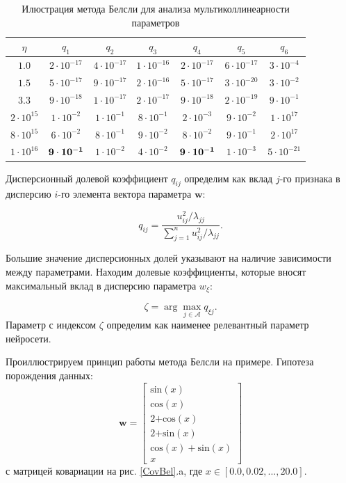 \begin{table}[h]
\begin{center}
\caption{Илюстрация метода Белсли для анализа мультиколлинеарности параметров}
\begin{tabular}{|c|cccccc|}
\hline
$\eta$ & $q_1$& $q_2$& $q_3$& $q_4$& $q_5$& $q_6$\\
\hline
$1.0$ &  $2\cdot 10^{-17}$ &  $4\cdot 10^{-17}$ &  $1\cdot 10^{-16}$ &  $2\cdot 10^{-17}$ &  $6\cdot 10^{-17}$&  $3\cdot 10^{-4}$ \\
\hline
$1.5$ &  $5\cdot 10^{-17}$ &  $9\cdot 10^{-17}$ &  $2\cdot 10^{-16}$ &  $5\cdot 10^{-17}$ &  $3\cdot 10^{-20}$ &  $3\cdot 10^{-2}$ \\
\hline
$3.3$ &  $9\cdot 10^{-18}$ &  $1\cdot 10^{-17}$ &  $2\cdot 10^{-17}$ &  $9\cdot 10^{-18}$ &  $2\cdot 10^{-19}$ &  $9\cdot 10^{-1}$ \\
\hline
$2\cdot 10^{15}$ &  $1\cdot 10^{-2}$ &  $1\cdot 10^{-1}$ &  $8\cdot 10^{-1}$ &  $2\cdot 10^{-3}$ &  $9\cdot 10^{-2}$ &  $1\cdot 10^{17}$ \\ 
\hline
$8\cdot 10^{15}$ &  $6\cdot 10^{-2}$ &  $8\cdot 10^{-1}$ &  $9\cdot 10^{-2}$ &  $8\cdot 10^{-2}$ &  $9\cdot 10^{-1}$ & $ 2\cdot 10^{17} $\\
\hline
$1\cdot 10^{16}$ &  $\bf9\cdot 10^{-1}$ &  $1\cdot 10^{-2}$& $ 4\cdot 10^{-2}$&  $\bf9\cdot 10^{-1}$ &  $1\cdot 10^{-3}$ & $ 5\cdot 10^{-21}$ \\
\hline
\end{tabular}
\label{CovBelTable}
\end{center}
\end{table}

Дисперсионный долевой коэффициент $q_{ij}$ определим как вклад $j$-го признака в дисперсию $i$-го элемента вектора параметра $\textbf{w}$:

\[
q_{ij} = \frac{u^2_{ij}/\lambda_{jj}}{\sum^n_{j=1}{u^2_{ij}/\lambda_{jj}}}.
\]

Большие значение дисперсионных долей указывают на наличие зависимости между параметрами. Находим долевые коэффициенты, которые вносят максимальный вклад в дисперсию параметра $w_\xi$:

\[
\zeta = \arg\max_{j\in \mathcal{A}}{q_{\xi j}}.
\]
Параметр с индексом $\zeta$ определим как наименее релевантный параметр нейросети. 

Проиллюстрируем принцип работы метода Белсли на примере. Гипотеза порождения данных: 
\[
\textbf{w} = \begin{bmatrix}
\text{sin}(x)\\
\text{cos}(x)\\
\text{2+cos}(x)\\
\text{2+sin}(x)\\
\text{cos}(x) + \text{sin}(x)\\
x
\end{bmatrix}
\]
с матрицей ковариации на рис. \ref{CovBel}.a, где $x \in [0.0, 0.02, ..., 20.0]$.


